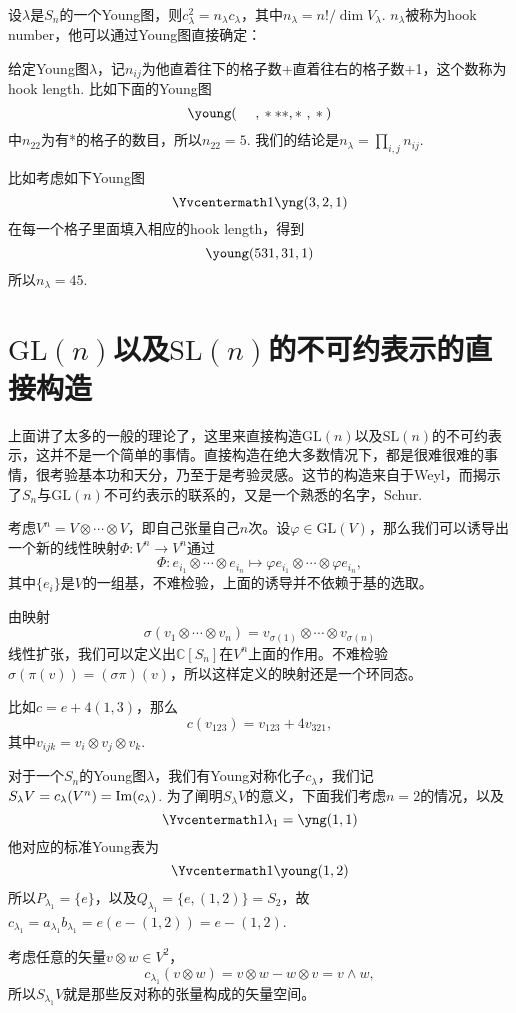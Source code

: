 \documentclass[9pt]{extarticle}
\newcommand{\cc}{\mathbb{C}}
\begin{document}
\pro 设$\lambda$是$S_n$的一个Young图，则$c_\lambda^2=n_\lambda c_\lambda$，其中$n_\lambda=n!/\dim V_\lambda$. $n_\lambda$被称为hook number，他可以通过Young图直接确定：

给定Young图$\lambda$，记$n_{ij}$为他直着往下的格子数+直着往右的格子数+1，这个数称为hook length. 比如下面的Young图
\[
	\young(~~~~,{}***,{}*~,{}*{})
\]
中$n_{22}$为有*的格子的数目，所以$n_{22}=5$. 我们的结论是$n_\lambda=\prod_{i,j}n_{ij}$.

比如考虑如下Young图\[\Yvcentermath1
	\yng(3,2,1)
\]
在每一个格子里面填入相应的hook length，得到
\[
	\young(531,31,1)
\]
所以$n_\lambda= 45$.

\section{$\mathrm{GL}(n)$以及$\mathrm{SL}(n)$的不可约表示的直接构造}

上面讲了太多的一般的理论了，这里来直接构造$\mathrm{GL}(n)$以及$\mathrm{SL}(n)$的不可约表示，这并不是一个简单的事情。直接构造在绝大多数情况下，都是很难很难的事情，很考验基本功和天分，乃至于是考验灵感。这节的构造来自于Weyl，而揭示了$S_n$与$\mathrm{GL}(n)$不可约表示的联系的，又是一个熟悉的名字，Schur.

\para 考虑$V^n=V\otimes\cdots \otimes V$，即自己张量自己$n$次。设$\varphi\in \mathrm{GL}(V)$，那么我们可以诱导出一个新的线性映射$\Phi:V^n\to V^n$通过
\[
	\Phi : e_{i_1}\otimes\cdots\otimes e_{i_n}\mapsto \varphi e_{i_1}\otimes\cdots\otimes \varphi e_{i_n},
\]
其中$\{e_i\}$是$V$的一组基，不难检验，上面的诱导并不依赖于基的选取。

\para 由映射
\[
	\sigma(v_{1}\otimes\cdots\otimes v_{n})=v_{{\sigma(1)}}\otimes\cdots\otimes v_{{\sigma(n)}}
\]
线性扩张，我们可以定义出$\cc [S_n]$在$V^n$上面的作用。不难检验$\sigma(\pi(v))=(\sigma\pi)(v)$，所以这样定义的映射还是一个环同态。

比如$c=e+4(1,3)$，那么
\[
	c(v_{123})=v_{123}+4v_{321},
\]
其中$v_{ijk}=v_{i}\otimes v_{j}\otimes v_{k}$.

\para 对于一个$S_n$的Young图$\lambda$，我们有Young对称化子$c_\lambda$，我们记$S_\lambda V= c_\lambda(V^n)=\operatorname{Im}(c_\lambda)$. 为了阐明$S_\lambda V$的意义，下面我们考虑$n=2$的情况，以及
\[\Yvcentermath1
	\lambda_1=\yng(1,1)
\]
他对应的标准Young表为
\[\Yvcentermath1
	\young(1,2)
\]
所以$P_{\lambda_1}=\{e\}$，以及$Q_{\lambda_1}=\{e,(1,2)\}=S_2$，故$c_{\lambda_1}=a_{\lambda_1} b_{\lambda_1} =e (e- (1,2))=e- (1,2)$.

考虑任意的矢量$v\otimes w\in V^2$，
\[
c_{\lambda_1}(v\otimes w)=v\otimes w-w\otimes v=v\wedge w,
\]
所以$S_{\lambda_1} V$就是那些反对称的张量构成的矢量空间。
\end{document}
